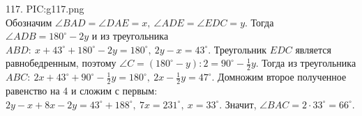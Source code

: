 117. {{PIC:g117.png}}\\
Обозначим $\angle BAD=\angle DAE=x,\ \angle ADE=\angle EDC=y.$ Тогда $\angle ADB=180^\circ-2y$ и из треугольника $ABD:\ x+43^\circ+180^\circ-2y=180^\circ,\ 2y-x=43^\circ.$ Треугольник $EDC$ является равнобедренным, поэтому $\angle C=(180^\circ-y):2=90^\circ-\frac{1}{2}y.$ Тогда из треугольника $ABC:\ 2x+43^\circ+90^\circ-\frac{1}{2}y=180^\circ,\ 2x-\frac{1}{2}y=47^\circ.$ Домножим второе полученное равенство на 4 и сложим с первым: $2y-x+8x-2y=43^\circ+188^\circ,\ 7x=231^\circ,\ x=33^\circ.$ Значит, $\angle BAC=2\cdot33^\circ=66^\circ.$\newpage\noindent
